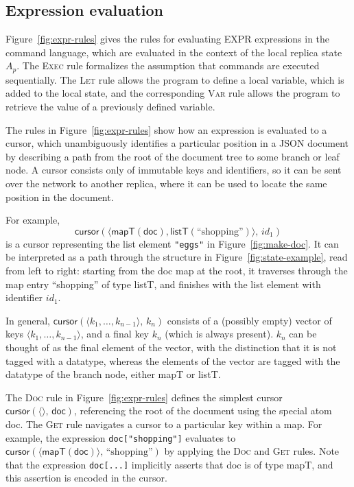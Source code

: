 \documentclass[10pt,journal,compsoc]{IEEEtran}
\begin{document}
\subsection{Expression evaluation}

Figure~\ref{fig:expr-rules} gives the rules for evaluating EXPR expressions in the command language, which are evaluated in the context of the local replica state $A_p$. The \textsc{Exec} rule formalizes the assumption that commands are executed sequentially. The \textsc{Let} rule allows the program to define a local variable, which is added to the local state, and the corresponding \textsc{Var} rule allows the program to retrieve the value of a previously defined variable.

The rules in Figure~\ref{fig:expr-rules} show how an expression is evaluated to a cursor, which unambiguously identifies a particular position in a JSON document by describing a path from the root of the document tree to some branch or leaf node. A cursor consists only of immutable keys and identifiers, so it can be sent over the network to another replica, where it can be used to locate the same position in the document.

For example,
\[ \mathsf{cursor}(\langle \mathsf{mapT}(\mathsf{doc}), \mathsf{listT}(\text{``shopping''}) \rangle,\, \mathit{id}_1) \]
is a cursor representing the list element \verb|"eggs"| in Figure~\ref{fig:make-doc}. It can be interpreted as a path through the structure in Figure~\ref{fig:state-example}, read from left to right: starting from the \textsf{doc} map at the root, it traverses through the map entry ``shopping'' of type \textsf{listT}, and finishes with the list element with identifier $\mathit{id}_1$.

In general, $\mathsf{cursor}(\langle k_1, \dots, k_{n-1} \rangle,\, k_n)$ consists of a (possibly empty) vector of keys $\langle k_1, \dots, k_{n-1} \rangle$, and a final key $k_n$ (which is always present). $k_n$ can be thought of as the final element of the vector, with the distinction that it is not tagged with a datatype, whereas the elements of the vector are tagged with the datatype of the branch node, either \textsf{mapT} or \textsf{listT}.

The \textsc{Doc} rule in Figure~\ref{fig:expr-rules} defines the simplest cursor $\mathsf{cursor}(\langle\rangle,\, \mathsf{doc})$, referencing the root of the document using the special atom \textsf{doc}. The \textsc{Get} rule navigates a cursor to a particular key within a map. For example, the expression \verb|doc["shopping"]| evaluates to $\mathsf{cursor}(\langle \mathsf{mapT}(\mathsf{doc}) \rangle,\, \text{``shopping''})$ by applying the \textsc{Doc} and \textsc{Get} rules. Note that the expression \verb|doc[...]| implicitly asserts that \textsf{doc} is of type \textsf{mapT}, and this assertion is encoded in the cursor.
\end{document}
